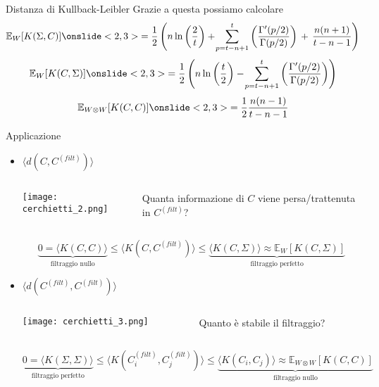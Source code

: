 \documentclass{beamer}
\newcommand{\1}{\mathbbm{1}}
\begin{document}
\begin{frame}{Distanza di Kullback-Leibler}
Grazie a questa possiamo calcolare
\[
\mathbb{E}_W[K(\Sigma,C)]
\onslide<2,3>{
	=\frac{1}{2}\left(
	n\ln\left(\frac{2}{t}\right) + 
	\!\sum_{p=t-n+1}^t \left(\frac{\Gamma'(p/2)}{\Gamma(p/2)}\right)\, +
	\,\frac{n(n+1)}{t-n-1}
	\right)
	}
\]
\[
\mathbb{E}_W[K(C,\Sigma)]
\onslide<2,3>{
	=\frac{1}{2}\left(
	n\ln\left(\frac{t}{2}\right) - 
	\!\sum_{p=t-n+1}^t \left(\frac{\Gamma'(p/2)}{\Gamma(p/2)}\right)
	\right)
	}
\]
\[
\mathbb{E}_{W\otimes W}[K(C,C)]
	\onslide<2,3>{
	=\frac{1}{2}\frac{n(n-1)}{t-n-1}
	}
\]
\vspace{10pt}

\end{frame}



\begin{frame}{Applicazione}

\begin{itemize}
\item $\langle d(C,C^{(filt)}) \rangle$\\
\vspace{3pt}
\begin{columns}
\begin{column}{0.1 \textwidth}
\texttt{[image: cerchietti\_2.png]}
\end{column}
\begin{column}{0.8 \textwidth}
Quanta informazione di $C$ viene persa/trattenuta in $C^{(filt)}$?
\end{column}
\end{columns}
\[
\underbrace{0 = \langle K(C,C)\rangle}_\text{filtraggio nullo}
\leq \langle K(C,C^{(filt)})\rangle \leq 
\underbrace{\langle K(C,\Sigma)\rangle \approx \mathbb{E}_W[K(C,\Sigma)]}_\text{filtraggio perfetto}
\]
\pause
\vspace{15pt}
\item $\langle d(C^{(filt)},C^{(filt)}) \rangle$\\
\vspace{3pt}
\begin{columns}
\begin{column}{0.1 \textwidth}
\texttt{[image: cerchietti\_3.png]}
\end{column}
\begin{column}{0.8 \textwidth}
Quanto è stabile il filtraggio?
\end{column}
\end{columns}
\[
\underbrace{0 = \langle K(\Sigma,\Sigma)\rangle}_\text{filtraggio perfetto} 
\leq \langle K(C_i^{(filt)},C_j^{(filt)})\rangle \leq
\underbrace{\langle K(C_i,C_j)\rangle \approx \mathbb{E}_{W\otimes W}[K(C,C)]}_\text{filtraggio nullo}
\]
\end{itemize}
\end{frame}
\end{document}
